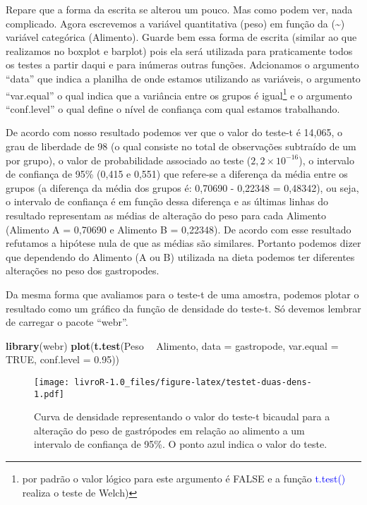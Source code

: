 \documentclass[titlepage, oneside, openany, a4paper]{book}
\newenvironment{Shaded}{\begin{snugshade}}{\end{snugshade}}
\newcommand{\DataTypeTok}[1]{\textcolor[rgb]{0.13,0.29,0.53}{#1}}
\newcommand{\FloatTok}[1]{\textcolor[rgb]{0.00,0.00,0.81}{#1}}
\newcommand{\KeywordTok}[1]{\textcolor[rgb]{0.13,0.29,0.53}{\textbf{#1}}}
\newcommand{\NormalTok}[1]{#1}
\newcommand{\OperatorTok}[1]{\textcolor[rgb]{0.81,0.36,0.00}{\textbf{#1}}}
\newcommand{\OtherTok}[1]{\textcolor[rgb]{0.56,0.35,0.01}{#1}}
\newcommand{\StringTok}[1]{\textcolor[rgb]{0.31,0.60,0.02}{#1}}
\begin{document}
Repare que a forma da escrita se alterou um pouco. Mas como podem ver, nada complicado. Agora escrevemos a variável quantitativa (peso) em função da (\textasciitilde{}) variável categórica (Alimento). Guarde bem essa forma de escrita (similar ao que realizamos no boxplot e barplot) pois ela será utilizada para praticamente todos os testes a partir daqui e para inúmeras outras funções. Adcionamos o argumento ``data'' que indica a planilha de onde estamos utilizando as variáveis, o argumento ``var.equal'' o qual indica que a variância entre os grupos é igual\footnote{por padrão o valor lógico para este argumento é FALSE e a função \textcolor{blue}{t.test()} realiza o teste de Welch)} e o argumento ``conf.level'' o qual define o nível de confiança com qual estamos trabalhando.

De acordo com nosso resultado podemos ver que o valor do teste-t é 14,065, o grau de liberdade de 98 (o qual consiste no total de observações subtraído de um por grupo), o valor de probabilidade associado ao teste (\(2,2\times10^{-16}\)), o intervalo de confiança de 95\% (0,415 e 0,551) que refere-se a diferença da média entre os grupos (a diferença da média dos grupos é: 0,70690 - 0,22348 = 0,48342), ou seja, o intervalo de confiança é em função dessa diferença e as últimas linhas do resultado representam as médias de alteração do peso para cada Alimento (Alimento A = 0,70690 e Alimento B = 0,22348). De acordo com esse resultado refutamos a hipótese nula de que as médias são similares. Portanto podemos dizer que dependendo do Alimento (A ou B) utilizada na dieta podemos ter diferentes alterações no peso dos gastropodes.

Da mesma forma que avaliamos para o teste-t de uma amostra, podemos plotar o resultado como um gráfico da função de densidade do teste-t. Só devemos lembrar de carregar o pacote ``webr''.

\begin{Shaded}
\begin{Highlighting}[]
\KeywordTok{library}\NormalTok{(webr)}
\KeywordTok{plot}\NormalTok{(}\KeywordTok{t.test}\NormalTok{(Peso }\OperatorTok{~}\StringTok{ }\NormalTok{Alimento, }
            \DataTypeTok{data =}\NormalTok{ gastropode,}
            \DataTypeTok{var.equal =} \OtherTok{TRUE}\NormalTok{,}
            \DataTypeTok{conf.level =} \FloatTok{0.95}\NormalTok{))}
\end{Highlighting}
\end{Shaded}

\begin{figure}
\centering
\texttt{[image: livroR-1.0\_files/figure-latex/testet-duas-dens-1.pdf]}
\caption{\label{fig:testet-duas-dens}Curva de densidade representando o valor do teste-t bicaudal para a alteração do peso de gastrópodes em relação ao alimento a um intervalo de confiança de 95\%. O ponto azul indica o valor do teste.}
\end{figure}
\end{document}
